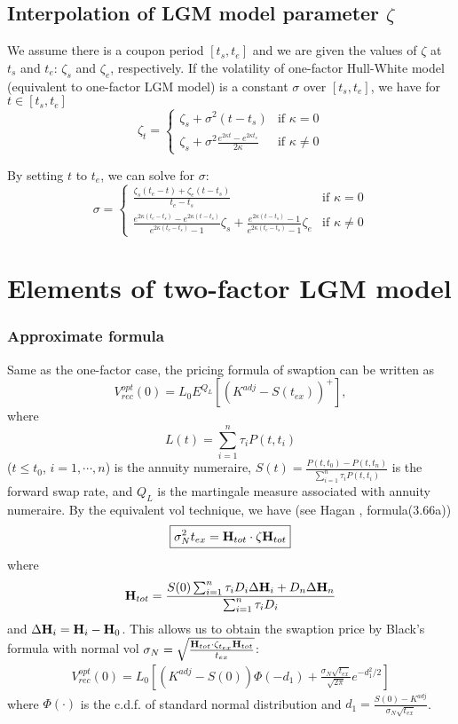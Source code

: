 \documentclass[10pt]{article}
\theoremstyle{plain}
\numberwithin{equation}{section}
\numberwithin{table}{section}
\begin{document}
\subsection{Interpolation of LGM model parameter $\zeta$}

We assume there is a coupon period $[t_s, t_e]$ and we are given the values of $\zeta$ at $t_s$ and $t_e$:
$\zeta_s$ and $\zeta_e$, respectively. If the volatility of one-factor Hull-White model (equivalent to one-factor
LGM model) is a constant $\sigma$ over $[t_s, t_e]$, we have for $t\in [t_s, t_e]$
\[
\zeta_t =
\begin{cases}
\zeta_s + \sigma^2(t-t_s) & \mbox{if $\kappa=0$} \\
\zeta_s + \sigma^2 \frac{e^{2\kappa t} - e^{2\kappa t_s}}{2\kappa} & \mbox{if $\kappa \ne 0$}
\end{cases}
\]

By setting $t$ to $t_e$, we can solve for $\sigma$:
\[
\sigma =
\begin{cases}
\frac{\zeta_s(t_e-t)+\zeta_e(t-t_s)}{t_e-t_s} & \mbox{if $\kappa=0$} \\
\frac{e^{2\kappa(t_e-t_s)} - e^{2\kappa(t-t_s)}}{e^{2\kappa(t_e-t_s)}-1}\zeta_s + \frac{e^{2\kappa(t-t_s)}-1}{e^{2\kappa(t_e-t_s)}-1}\zeta_e & \mbox{if $\kappa \ne 0$}
\end{cases}
\]

\section{Elements of two-factor LGM model}\label{sect_LGM2F}

\subsubsection{Approximate formula}

Same as the one-factor case, the pricing formula of swaption can be written as
\[
V^{opt}_{rec}(0) = L_0 E^{Q_L}[(K^{adj}- S(t_{ex}))^+],
\]
where
\[
L(t) = \sum_{i=1}^n\tau_i P(t,t_i)
\]
($t\le t_0$, $i=1,\cdots, n$) is the annuity numeraire,
$S(t)=\frac{P(t,t_0)-P(t,t_n)}{\sum_{i=1}^n\tau_iP(t,t_i)}$ is the
forward swap rate, and $Q_L$ is the martingale measure associated with
annuity numeraire. By the equivalent vol technique, we have (see Hagan
\cite{Haganb}, formula(3.66a))
\begin{eqnarray}\label{formula_HW2F_calib_normal_vol}
\boxed{
\sigma_N^2t_{ex} = {\bf H}_{tot} \cdot \zeta {\bf H}_{tot}
}
\end{eqnarray}
where
\[
{\bf H}_{tot} = \frac{S(0)\sum_{i=1}^n \tau_i D_i \Delta {\bf H}_i +
D_n\Delta {\bf H}_n}{\sum_{i=1}^n\tau_iD_i}
\]
and $\Delta {\bf H}_i = {\bf H}_i - {\bf H}_0$. This allows us to
obtain the swaption price by Black's formula with normal vol $\sigma_N
= \sqrt{\frac{{\bf H}_{tot}\cdot \zeta_{t_{ex}}{\bf
H}_{tot}}{t_{ex}}}$:
\begin{eqnarray}\label{formula_HW2F_swaption_approximate}
\boxed{
V_{rec}^{opt}(0) = L_0
\left[(K^{adj}-S(0))\Phi(-d_1)+\frac{\sigma_N\sqrt{t_{ex}}}{\sqrt{2\pi}}e^{-d_1^2/2}\right]
}
\end{eqnarray}
where $\Phi(\cdot)$ is the c.d.f. of standard normal distribution and
$d_1 = \frac{S(0)-K^{adj}}{\sigma_N \sqrt{t_{ex}}}$.
\end{document}
